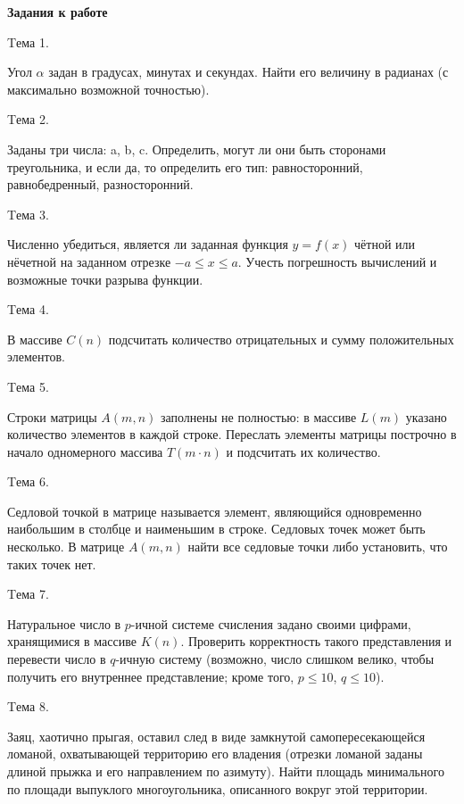 \documentclass[12pt, a4paper]{article}
\begin{document}
	\begin{flushleft}
		\newpage
		{\Large \textbf{Задания к работе}} \par
		{Tема 1. \par Угол $\alpha$ задан в градусах, минутах и секундах.
		Найти его величину в радианах (с максимально возможной точностью).} \par
		{Tема 2. \par Заданы три числа: a, b, c. Определить, могут ли они быть сторонами
		треугольника, и если да, то определить его тип:
		равносторонний,	равнобедренный, разносторонний.} \par
		{Tема 3. \par Численно убедиться, является ли заданная функция $y=f(x)$
		чётной или нёчетной на заданном отрезке $-a\leq x \leq a$. Учесть погрешность
		вычислений и возможные точки разрыва функции.} \par
		{Tема 4. \par В массиве $C(n)$ подсчитать количество отрицательных и сумму
		положительных элементов.} \par
		{Tема 5. \par Строки матрицы $A(m,n)$ заполнены не полностью: в массиве
		$L(m)$ указано количество элементов в каждой строке. Переслать элементы
		 матрицы построчно в начало одномерного массива $T(m\cdot n)$ и
		подсчитать их количество.} \par
		{Tема 6. \par Седловой точкой в матрице называется элемент, являющийся
		одновременно наибольшим в столбце и наименьшим в строке. Седловых 
		точек может быть несколько. В матрице $A(m,n)$ найти все седловые
		точки либо установить, что таких точек нет.} \par
		{Tема 7. \par Натуральное число в $p$-ичной системе счисления задано своими
		цифрами, хранящимися в массиве $K(n)$. Проверить корректность такого 
		представления и перевести число в $q$-ичную систему (возможно,
		число слишком велико, чтобы получить его внутреннее представление;
		кроме того, $p\leq 10$, $q\leq 10$).} \par
		{Tема 8. \par Заяц, хаотично прыгая, оставил след в виде замкнутой самопересекающейся
		ломаной, охватывающей территорию его владения (отрезки
		ломаной заданы длиной прыжка и его направлением по азимуту).
		Найти площадь минимального по площади выпуклого многоугольника,
		описанного вокруг этой территории.} \par
		\newpage

\end{flushleft}
\end{document}

